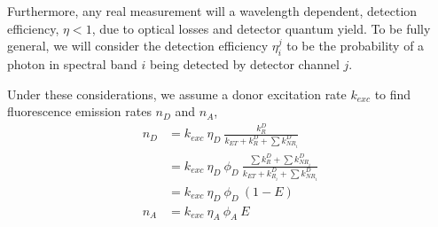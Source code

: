 \documentclass{article}
\newcommand{\NR}{\ensuremath{\mathit{NR}}}          %
\newcommand{\ET}{\ensuremath{\mathit{ET}}}          %
\begin{document}
Furthermore, any real measurement will a wavelength dependent,
detection efficiency, $\eta < 1$, due to optical losses and detector
quantum yield. To be fully general, we will consider the detection
efficiency $\eta^j_i$ to be the probability of a photon in spectral
band $i$ being detected by detector channel $j$.

Under these considerations, we assume a donor
excitation rate $k_{exc}$ to find fluorescence emission rates $n_D$
and $n_A$,
\begin{align}
  n_D & = k_{exc} ~ \eta_D ~ \frac{k^D_R}{k_\ET + k^D_R + \sum k^D_{\NR_i}} \\
      & = k_{exc} ~ \eta_D ~ \phi_D ~
         \frac{\sum k^D_R + \sum k^D_{\NR_i}}{k_\ET + k^D_{R_i} + \sum k^D_{\NR_i}} \\
      & = k_{exc} ~ \eta_D ~ \phi_D ~ (1 - E) \\
  n_A & = k_{exc} ~ \eta_A ~ \phi_A ~ E \\
\end{align}
\end{document}
